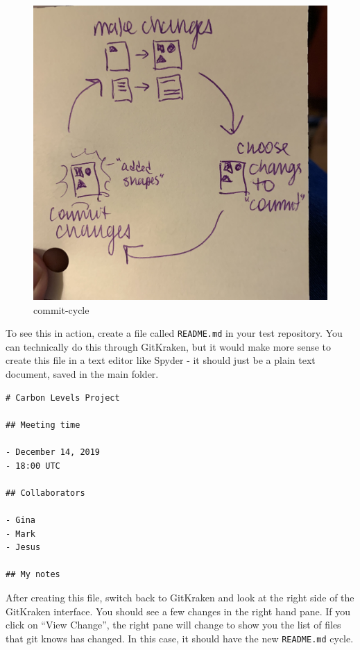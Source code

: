 \documentclass[]{Nemilov}
\begin{document}
\begin{figure}
\centering
\includegraphics{figures/py-version-control/tmp-commit-cycle.jpeg}
\caption{commit-cycle}
\end{figure}

To see this in action, create a file called \texttt{README.md} in your test repository.
You can technically do this through GitKraken, but it would make more sense to
create this file in a text editor like Spyder - it should just be a plain text
document, saved in the main folder.

\begin{verbatim}
# Carbon Levels Project

## Meeting time

- December 14, 2019
- 18:00 UTC

## Collaborators

- Gina
- Mark
- Jesus

## My notes
\end{verbatim}

After creating this file, switch back to GitKraken and
look at the right side of the GitKraken interface. You should see a few changes
in the right hand pane. If you click on ``View Change'', the right pane will change to show you the list of files that git knows has changed. In this case, it should
have the new \texttt{README.md} cycle.
\end{document}
